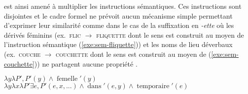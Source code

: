 \documentclass[output=paper]{langsci/langscibook}
\begin{document}
\cite{Fradin03} est ainsi amené à multiplier les instructions sémantiques. Ces instructions sont disjointes et le cadre formel ne prévoit aucun mécanisme simple permettant d'exprimer leur similarité comme dans le cas de la suffixation en \emph{\mbox{-ette}} où les dérivés féminins (ex.\ \textsc{flic} $\rightarrow$ \textsc{fliquette} dont le sens est construit au moyen de l'instruction sémantique (\ref{exe:sem-fliquette})) et les noms de lieu déverbaux (ex.\ \textsc{couche} $\rightarrow$ \textsc{couchette} dont le sens est construit au moyen de (\ref{exe:sem-couchette})) ne partagent aucune propriété \citep{fradin2003.lf-ette}.

\begin{exe}
  \ex\label{exe:sem-fliquette}$\lambda y\lambda P', P'(y) \wedge \operatorname{femelle}'(y)$
\ex\label{exe:sem-couchette}$\lambda y \lambda x \lambda P' \exists e, P'(e, x, ...) \wedge \operatorname{dans}'(e, y) \wedge \operatorname{temporaire}'(e)$
\end{exe}
\end{document}
